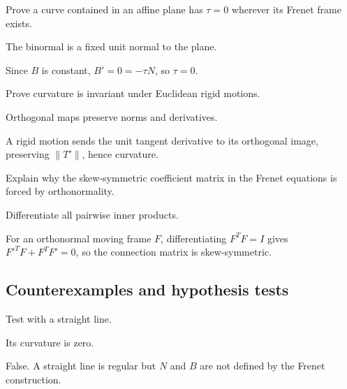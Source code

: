 \begin{exercise}\label{exr:vii13-ped-07}
Prove a curve contained in an affine plane has \(\tau=0\) wherever its Frenet frame exists.
\end{exercise}
\begin{hint}
The binormal is a fixed unit normal to the plane.
\end{hint}
\begin{solution}
Since \(B\) is constant, \(B'=0=-\tau N\), so \(\tau=0\).
\end{solution}

\begin{exercise}\label{exr:vii13-ped-08}
Prove curvature is invariant under Euclidean rigid motions.
\end{exercise}
\begin{hint}
Orthogonal maps preserve norms and derivatives.
\end{hint}
\begin{solution}
A rigid motion sends the unit tangent derivative to its orthogonal image, preserving \(\|T'\|\), hence curvature.
\end{solution}

\begin{exercise}\label{exr:vii13-ped-09}
Explain why the skew-symmetric coefficient matrix in the Frenet equations is forced by orthonormality.
\end{exercise}
\begin{hint}
Differentiate all pairwise inner products.
\end{hint}
\begin{solution}
For an orthonormal moving frame \(F\), differentiating \(F^TF=I\) gives \(F'^TF+F^TF'=0\), so the connection matrix is skew-symmetric.
\end{solution}

\subsection*{Counterexamples and hypothesis tests}

\begin{exercise}\label{exr:vii13-ped-10}
Test with a straight line.
\end{exercise}
\begin{hint}
Its curvature is zero.
\end{hint}
\begin{solution}
False.  A straight line is regular but \(N\) and \(B\) are not defined by the Frenet construction.
\end{solution}

